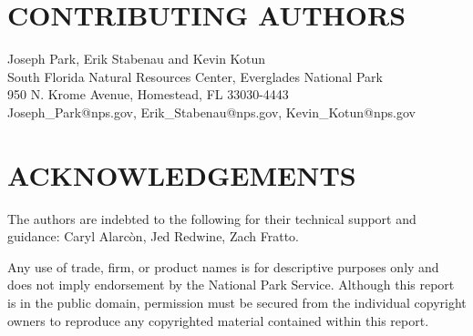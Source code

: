 \section*{CONTRIBUTING AUTHORS}



Joseph Park, Erik Stabenau and Kevin Kotun\\
South Florida Natural Resources Center, Everglades National Park\\
950 N. Krome Avenue, Homestead, FL 33030-4443\\[0.1in]

{} Joseph\_Park@nps.gov, Erik\_Stabenau@nps.gov, Kevin\_Kotun@nps.gov

\section*{ACKNOWLEDGEMENTS}



The authors are indebted to the following for their technical support and guidance:
Caryl Alarc\`{o}n, Jed Redwine, Zach Fratto.
\\[0.1in]


\vfill


\noindent Any use of trade, firm, or product names is for descriptive purposes only and does not imply endorsement by the National Park Service. Although this report is in the public domain, permission must be secured from the individual copyright owners to reproduce any copyrighted material contained within this report.
\\[0.1in]

